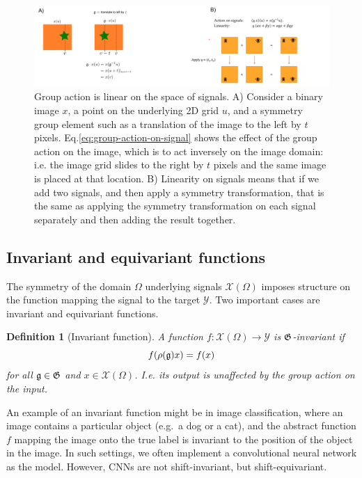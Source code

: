 \documentclass[11pt]{article}
\numberwithin{equation}{section}
\newtheorem{defn}{Definition}[section]
\begin{document}
\begin{figure}
\begin{center}
\includegraphics[width=\columnwidth]{../figures/group-action-linearity.png}  
\end{center}
\caption{Group action is linear on the space of signals. A) Consider a binary image $x$, a point on the underlying 2D grid $u$, and a symmetry group element such as a translation of the image to the left by $t$ pixels. Eq.\eqref{eq:group-action-on-signal} shows the effect of the group action on the image, which is to act inversely on the image domain: i.e. the image grid slides to the right by $t$ pixels and the same image is placed at that location. B) Linearity on signals means that if we add two signals, and then apply a symmetry transformation, that is the same as applying the symmetry transformation on each signal separately and then adding the result together. 
}
\label{fig:linearity-group-action}
\end{figure}

\subsection{Invariant and equivariant functions}
The symmetry of the domain $\Omega$ underlying signals $\mathcal{X}(\Omega)$ imposes structure on the function mapping the signal to the target $\mathcal{Y}$. Two important cases are invariant and equivariant functions.

\begin{defn}[Invariant function]
A function $f: \mathcal{X}(\Omega) \rightarrow \mathcal{Y}$ is $\mathfrak{G}$-invariant if 
\begin{equation}
f(\rho(\mathfrak{g})x)=f(x) \label{eq:inuivariant-fcn}
\end{equation}
for all $\mathfrak{g} \in \mathfrak{G}$ and $x \in \mathcal{X}(\Omega)$. I.e. its output is unaffected by the group action on the input.
\end{defn}

An example of an invariant function might be in image classification, where an image contains a particular object (e.g.\ a dog or a cat), and the abstract function $f$ mapping the image onto the true label is invariant to the position of the object in the image. In such settings, we often implement a convolutional neural network as the model. However, CNNs are not shift-invariant, but shift-equivariant.
\end{document}
